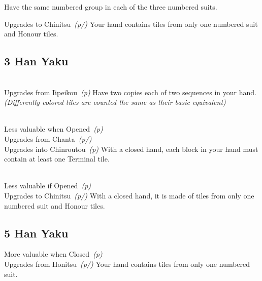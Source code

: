 	{}
	{Have the same numbered group in each of the three numbered suits.}

	{\upgradesto Upgrades to Chinitsu~\textit{(p\pageref{core:yaku:Chinitsu}/\pageref{core:yaku:Menzen Chinitsu})}}
	{Your hand contains tiles from only one numbered suit and Honour tiles.}


\subsection{3 Han Yaku}\label{core:ssec:3-han-yaku}

	{\closedhand \\ 
	\upgradesfrom Upgrades from Iipeikou~\textit{(p\pageref{core:yaku:Iipeikou})}}
	{Have two copies each of two sequences in your hand. \textit{(Differently colored tiles are counted the same as their basic equivalent)}}

	{\closedhand \\ 
	\lessvaluable Less valuable when Opened~\textit{(p\pageref{core:yaku:Junchan})}\\
	\upgradesfrom Upgrades from Chanta~\textit{(p\pageref{core:yaku:Chanta}/\pageref{core:yaku:Menzen Chanta})} \\
	\upgradesto Upgrades into Chinroutou~\textit{(p\pageref{core:yaku:Chinroutou})}}
	{With a closed hand, each block in your hand must contain at least one Terminal tile.}

	{\closedhand \\
	\morevaluable Less valuable if Opened~\textit{(p\pageref{core:yaku:Honitsu})}\\
	\upgradesto Upgrades to Chinitsu~\textit{(p\pageref{core:yaku:Chinitsu}/\pageref{core:yaku:Menzen Chinitsu})}}
	{With a closed hand, it is made of tiles from only one numbered suit and Honour tiles.}


\subsection{5 Han Yaku}\label{core:ssec:5-han-yaku}

	{\morevaluable More valuable when Closed~\textit{(p\pageref{core:yaku:Menzen Chinitsu})} \\
	\upgradesfrom Upgrades from Honitsu~\textit{(p\pageref{core:yaku:Honitsu}/\pageref{core:yaku:Menzen Honitsu})}}
	{Your hand contains tiles from only one numbered suit.}


